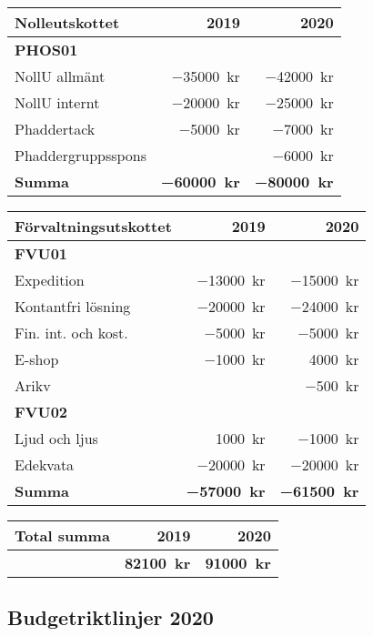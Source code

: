 \documentclass[../_main/handlingar.tex]{subfiles}
\begin{document}
\begin{tabularx}{10cm}{X r r}
    \textbf{\large Nolleutskottet} & \textbf{2019} & \textbf{2020} \\
    \hline
    \textbf{PHOS01} \\
    NollU allmänt & \SI{-35000}{kr} & \SI{-42000}{kr} \\
    NollU internt & \SI{-20000}{kr} & \SI{-25000}{kr} \\
    Phaddertack & \SI{-5000}{kr} & \SI{-7000}{kr} \\
    Phaddergruppsspons & & \SI{-6000}{kr} \\
    \hline
    \textbf{Summa} & \textbf{\SI{-60000}{kr}} & \textbf{\SI{-80000}{kr}} \\
\end{tabularx}

\begin{tabularx}{9cm}{X r r}
    \textbf{\large Förvaltningsutskottet} & \textbf{2019} & \textbf{2020} \\
    \hline
    \textbf{FVU01} \\
    Expedition & \SI{-13000}{kr} & \SI{-15000}{kr} \\
    Kontantfri lösning & \SI{-20000}{kr} & \SI{-24000}{kr} \\
    Fin. int. och kost. & \SI{-5000}{kr} & \SI{-5000}{kr} \\
    E-shop & \SI{-1000}{kr} & \SI{4000}{kr} \\
    Arikv & & \SI{-500}{kr} \\
    \textbf{FVU02} \\
    Ljud och ljus & \SI{1000}{kr} & \SI{-1000}{kr} \\
    Edekvata & \SI{-20000}{kr} & \SI{-20000}{kr} \\
    \hline
    \textbf{Summa} & \textbf{\SI{-57000}{kr}} & \textbf{\SI{-61500}{kr}} \\
\end{tabularx}

\begin{tabularx}{9cm}{X r r}
    \textbf{\large Total summa} & \textbf{2019} & \textbf{2020} \\
    \hline
     & \textbf{\SI{82100}{kr}} & \textbf{\SI{91000}{kr}} \\
\end{tabularx}


\newpage
\subsection*{Budgetriktlinjer 2020}
\end{document}
